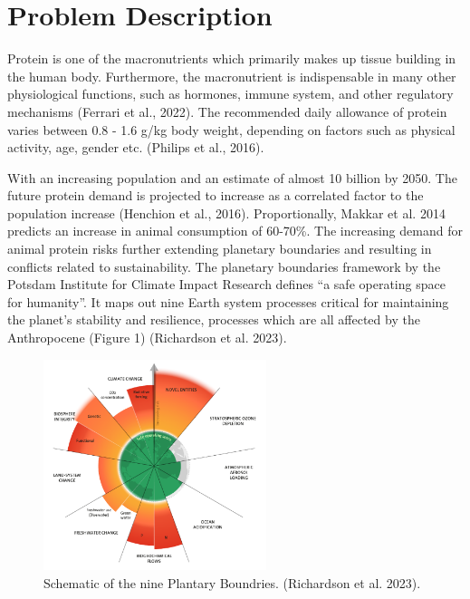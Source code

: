 \setcounter{chapter}{1}
\setcounter{section}{0}
\setlength{\headheight}{12.71342pt}
\addtolength{\topmargin}{-0.71342pt}

\section{Problem Description}
Protein is one of the macronutrients which primarily makes up tissue building in the human body. Furthermore, the macronutrient is indispensable in many other physiological functions, such as hormones, immune system, and other regulatory mechanisms (Ferrari et al., 2022). The recommended daily allowance of protein varies between 0.8 - 1.6 g/kg body weight, depending on factors such as physical activity, age, gender etc. (Philips et al., 2016).

\vspace{1em}
With an increasing population and an estimate of almost 10 billion by 2050. The future protein demand is projected to increase as a correlated factor to the population increase (Henchion et al., 2016). Proportionally, Makkar et al. 2014 predicts an increase in animal consumption of 60-70\%. The increasing demand for animal protein risks further extending planetary boundaries and resulting in conflicts related to sustainability. The planetary boundaries framework by the Potsdam Institute for Climate Impact Research defines “a safe operating space for humanity”. It maps out nine Earth system processes critical for maintaining the planet's stability and resilience, processes which are all affected by the Anthropocene (Figure 1) (Richardson et al. 2023).

\begin{figure}[H]
    \centering
    \includegraphics[width=0.58\textwidth]{Figures/fig_01.png}
    \caption{Schematic of the nine Plantary Boundries. (Richardson et al. 2023).}
    \label{fig:introduction_01}
\end{figure}

